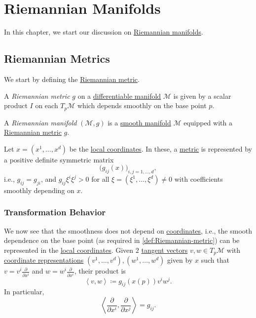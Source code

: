 \chapter{Riemannian Manifolds}
In this chapter, we start our discussion on \hyperref[def:Riemannian-manifold]{Riemannian manifolds}.

\section{Riemannian Metrics}
We start by defining the \hyperref[def:Riemannian-metric]{Riemannian metric}.

\begin{definition}\label{def:Riemannian-metric}
	A \emph{Riemannian metric} \(g\) on a \hyperref[def:smooth-manifold]{differentiable manifold} \(\mathcal{M} \) is given by a scalar product \(I\) on each \(T_p \mathcal{M} \) which depends smoothly on the base point \(p\).
\end{definition}

\begin{definition}\label{def:Riemannian-manifold}
	A \emph{Riemannian manifold} \((\mathcal{M} , g)\) is a \hyperref[def:smooth-manifold]{smooth manifold} \(\mathcal{M} \) equipped with a \hyperref[def:Riemannian-metric]{Riemannian metric} \(g\).
\end{definition}

Let \(x=(x^1, \ldots , x^d)\) be the \hyperref[def:coordinate-chart]{local coordinates}. In these, a \hyperref[def:Riemannian-metric]{metric} is represented by a positive definite symmetric matrix
\[
	\big( g_{ij} (x) \big) _{i, j=1, \ldots , d},
\]
i.e., \(g_{ij} = g_{ji} \), and \(g_{ij} \xi ^i \xi ^j > 0\) for all \(\xi =(\xi ^1, \ldots , \xi ^d) \neq 0\) with coefficients smoothly depending on \(x\).

\subsection{Transformation Behavior}
We now see that the smoothness does not depend on \hyperref[def:coordinate-chart]{coordinates}, i.e., the smooth dependence on the base point (as required in \autoref{def:Riemannian-metric}) can be represented in the \hyperref[def:coordinate-chart]{local coordinates}. Given \(2\) \hyperref[def:tangent-vector]{tangent vectors} \(v, w\in T_p \mathcal{M} \) with \hyperref[def:coordinate-chart]{coordinate representations} \((v^1, \ldots , v^d), (w^1, \ldots , w^d)\) given by \(x\) such that \(v = v^i \frac{\partial }{\partial x^i} \) and \(w = w^i \frac{\partial }{\partial x^i} \), their product is
\[
	\left\langle v, w \right\rangle \coloneqq g_{ij} (x(p)) v^i w^j.
\]
In particular,
\[
	\left\langle \frac{\partial }{\partial x^i} , \frac{\partial }{\partial x^j}  \right\rangle = g_{ij} .
\]

